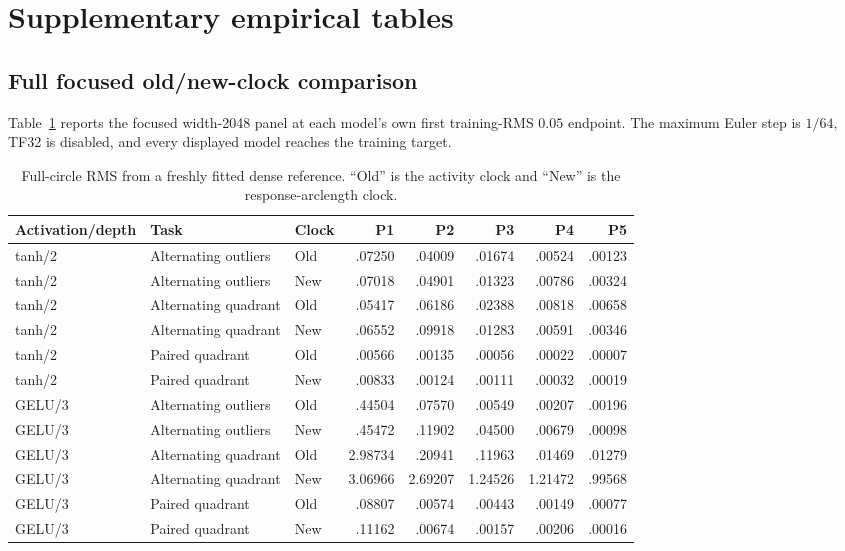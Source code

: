 \section{Supplementary empirical tables}
\label{app:experiment-tables}

\subsection{Full focused old/new-clock comparison}

Table~\ref{tab:clock-full} reports the focused width-2048 panel at each model's
own first training-RMS $0.05$ endpoint.  The maximum Euler step is $1/64$,
TF32 is disabled, and every displayed model reaches the training target.

\begin{table}[h]
\centering
\scriptsize
\caption{Full-circle RMS from a freshly fitted dense reference.  ``Old'' is
the activity clock and ``New'' is the response-arclength clock.}
\label{tab:clock-full}
\begin{tabular}{@{}lllrrrrr@{}}
\toprule
Activation/depth & Task & Clock & P1 & P2 & P3 & P4 & P5\\
\midrule
tanh/2 & Alternating outliers & Old & .07250 & .04009 & .01674 & .00524 & .00123\\
tanh/2 & Alternating outliers & New & .07018 & .04901 & .01323 & .00786 & .00324\\
tanh/2 & Alternating quadrant & Old & .05417 & .06186 & .02388 & .00818 & .00658\\
tanh/2 & Alternating quadrant & New & .06552 & .09918 & .01283 & .00591 & .00346\\
tanh/2 & Paired quadrant & Old & .00566 & .00135 & .00056 & .00022 & .00007\\
tanh/2 & Paired quadrant & New & .00833 & .00124 & .00111 & .00032 & .00019\\
GELU/3 & Alternating outliers & Old & .44504 & .07570 & .00549 & .00207 & .00196\\
GELU/3 & Alternating outliers & New & .45472 & .11902 & .04500 & .00679 & .00098\\
GELU/3 & Alternating quadrant & Old & 2.98734 & .20941 & .11963 & .01469 & .01279\\
GELU/3 & Alternating quadrant & New & 3.06966 & 2.69207 & 1.24526 & 1.21472 & .99568\\
GELU/3 & Paired quadrant & Old & .08807 & .00574 & .00443 & .00149 & .00077\\
GELU/3 & Paired quadrant & New & .11162 & .00674 & .00157 & .00206 & .00016\\
\bottomrule
\end{tabular}
\end{table}

